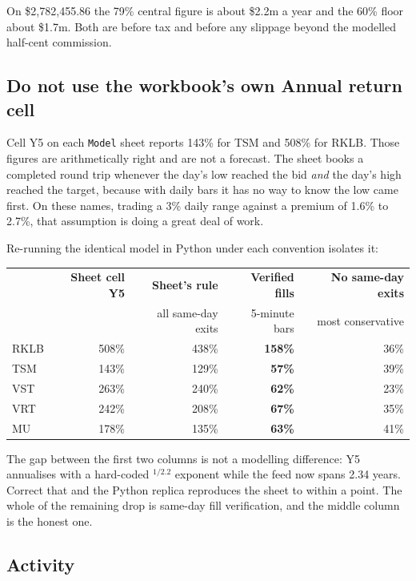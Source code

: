 \documentclass[11pt]{article}
\begin{document}
On \$2{,}782{,}455.86 the 79\% central figure is about \$2.2m a year and the 60\% floor about
\$1.7m. Both are before tax and before any slippage beyond the modelled half-cent commission.

\subsection{Do not use the workbook's own Annual return cell}

Cell Y5 on each \texttt{Model} sheet reports 143\% for TSM and 508\% for RKLB. Those figures are
arithmetically right and are not a forecast. The sheet books a completed round trip whenever the
day's low reached the bid \emph{and} the day's high reached the target, because with daily bars it
has no way to know the low came first. On these names, trading a 3\% daily range against a
premium of 1.6\% to 2.7\%, that assumption is doing a great deal of work.

Re-running the identical model in Python under each convention isolates it:

\begin{center}
\footnotesize
\begin{tabular}{@{}l r r r r@{}}
\toprule
& \textbf{Sheet cell Y5} & \textbf{Sheet's rule} & \textbf{Verified fills} & \textbf{No same-day exits} \\
& & \tiny all same-day exits & \tiny 5-minute bars & \tiny most conservative \\
\midrule
RKLB & 508\% & 438\% & \textbf{158\%} & 36\% \\
TSM  & 143\% & 129\% & \textbf{~57\%} & 39\% \\
VST  & 263\% & 240\% & \textbf{~62\%} & 23\% \\
VRT  & 242\% & 208\% & \textbf{~67\%} & 35\% \\
MU   & 178\% & 135\% & \textbf{~63\%} & 41\% \\
\bottomrule
\end{tabular}
\end{center}

The gap between the first two columns is not a modelling difference: Y5 annualises with a
hard-coded $^{1/2.2}$ exponent while the feed now spans 2.34 years. Correct that and the Python
replica reproduces the sheet to within a point. The whole of the remaining drop is same-day fill
verification, and the middle column is the honest one.

\subsection{Activity}
\end{document}
